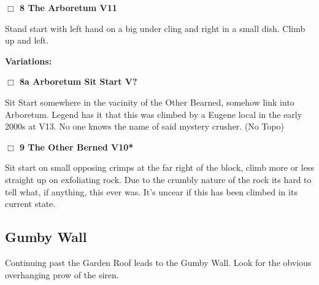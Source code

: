 	\begin{multicols}{2}


\needspace{1.5cm}
\label{rt:The Arboretum}
\colorbox{red!20}{
\parbox{0.95\linewidth}{
\hspace{-1ex}\textbf{$\Box$
8 The Arboretum V11  
}}}
\begin{adjustwidth}{1.3em}{}			
Stand start with left hand on a big under cling and right in a small dish. Climb up and left.
\end{adjustwidth}


\begin{adjustwidth}{0.5cm}{}				
\needspace{3cm}
\textbf{Variations:} \newline

\needspace{1.5cm}
\label{vr:Arboretum Sit Start}
\colorbox{black!20}{
\parbox{0.95\linewidth}{
\hspace{-1ex}\textbf{$\Box$
8a Arboretum Sit Start V?  
}}}
\begin{adjustwidth}{1.3em}{}			
Sit Start somewhere in the vacinity of the Other Bearned, somehow link into Arboretum. Legend has it that this was climbed by a Eugene local in the early 2000s at V13. No one knows the name of said mystery crusher.
  (No Topo)
\end{adjustwidth}



\end{adjustwidth}


\needspace{1.5cm}
\label{rt:The Other Berned}
\colorbox{red!20}{
\parbox{0.95\linewidth}{
\hspace{-1ex}\textbf{$\Box$
9 The Other Berned V10*  
}}}
\begin{adjustwidth}{1.3em}{}			
Sit start on small opposing crimps at the far right of the block, climb more or less straight up on exfoliating rock. Due to the crumbly nature of the rock its hard to tell what, if anything, this ever was. It's uncear if this has been climbed in its current state.
\end{adjustwidth}





\needspace{1.5cm}
\subsection*{Gumby Wall}\label{bf:Gumby Wall}
Continuing past the Garden Roof leads to the Gumby Wall. Look for the obvious overhanging prow of the siren.\\
	



\end{multicols}
